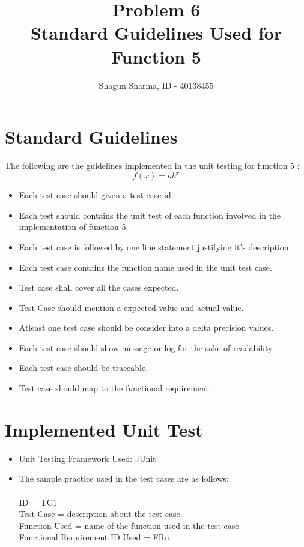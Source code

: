 \documentclass[a4paper,12pt]{article}
\title{Problem 6\\
\large Standard Guidelines Used for Function 5}
\author{Shagun Sharma, ID - 40138455}
\date{}
\begin{document}
\maketitle
\section{Standard Guidelines}
    The following are the guidelines implemented in the unit testing for function 5 :
    \begin{equation} \label{Power_func}
	f(x) = ab^x
\end{equation}

\begin{itemize}
    \item Each test case should given a test case id.
    \item Each test should contains the unit test of each function involved in the implementation of function 5.
    \item Each test case is followed by one line statement justifying it's description.
    \item Each test case contains the function name used in the unit test case.
    \item Test case shall cover all the cases expected.
    \item Test Case should mention a expected value and actual value.
    \item Atleast one test case should be consider into a delta precision values.
    \item Each test case should show message or log for the sake of readability.
    \item Each test case should be traceable.
    \item Test case should map to the functional requirement.
\end{itemize}

\section{Implemented Unit Test}
\begin{itemize}
    \item  Unit Testing Framework Used: JUnit
    \item The sample practice used in the test cases are as follows:\\
    \\ID = TC1
 \\Test  Case =  description about the test case.
 \\Function Used = name of the function used in the test case.
 \\Functional Requirement ID Used = FRn
\end{itemize}
   
 
 \
\end{document}
